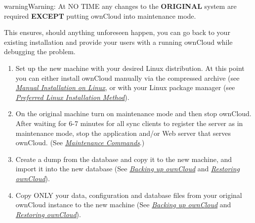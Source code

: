 \documentclass[letterpaper,10pt,english]{sphinxmanual}
\begin{document}
\begin{notice}{warning}{Warning:}
At NO TIME any changes to the \textbf{ORIGINAL} system are required
\textbf{EXCEPT} putting ownCloud into maintenance mode.

This ensures, should anything unforeseen happen, you can go
back to your existing installation and provide your users
with a running ownCloud while debugging the problem.
\end{notice}
\begin{enumerate}
\item {} 
Set up the new machine with your desired Linux distribution. At this point you can either install ownCloud manually via the compressed archive (see {\hyperref[installation/source_installation::doc]{\emph{\emph{Manual Installation on Linux}}}}, or with your Linux package manager (see {\hyperref[installation/linux_installation::doc]{\emph{\emph{Preferred Linux Installation Method}}}}).

\item {} 
On the original machine turn on maintenance mode and then stop ownCloud. After waiting for 6-7 minutes for all sync clients to register the server as in maintenance mode, stop the application and/or Web server that serves ownCloud. (See {\hyperref[configuration_server/occ_command:maintenance\string-commands\string-label]{\emph{Maintenance Commands}}}.)

\item {} 
Create a dump from the database and copy it to the new machine, and import it into the new database (See {\hyperref[maintenance/backup::doc]{\emph{\emph{Backing up ownCloud}}}} and {\hyperref[maintenance/restore::doc]{\emph{\emph{Restoring ownCloud}}}}).

\item {} 
Copy ONLY your data, configuration and database files from your original ownCloud instance to the new machine (See {\hyperref[maintenance/backup::doc]{\emph{\emph{Backing up ownCloud}}}} and {\hyperref[maintenance/restore::doc]{\emph{\emph{Restoring ownCloud}}}}).

\end{enumerate}
\end{document}
